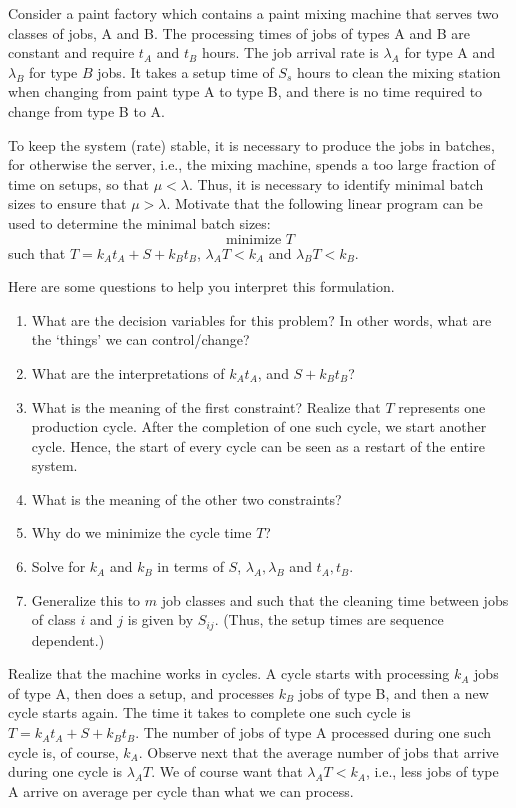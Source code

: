 \begin{exercise}
  Consider a paint factory which contains a paint mixing machine that
  serves two classes of jobs, A and B. The processing times of jobs of
  types A and B are constant and require $t_A$ and $t_B$ hours. The
  job arrival rate is $\lambda_A$ for type A and $\lambda_B$ for type
  $B$ jobs. It takes a setup time of $S_s$ hours to clean the mixing
  station when changing from paint type A to type B, and there is no
  time required to change from type B to A.

  To keep the system (rate) stable, it is necessary to produce the
  jobs in batches, for otherwise the server, i.e., the mixing machine,
  spends a too large fraction of time on setups, so that
  $\mu < \lambda$. Thus, it is necessary to identify minimal batch
  sizes to ensure that $\mu > \lambda$.  Motivate that the following linear
  program  can be used to determine the minimal batch sizes:
\begin{equation*}
  \text{minimize }  T
\end{equation*}
such that $ T=  k_A t_A + S + k_B t_B$, $\lambda_A T < k_A$ and $\lambda_B T < k_B$.
\begin{hint}
Here are some questions to help you interpret this formulation.
\begin{enumerate}
\item   What are the decision variables for this problem? In other words, what are the `things' we can control/change?
\item What are the interpretations of $k_A t_A$, and $S+k_B t_B$?
\item What is the meaning of the first constraint?  Realize that $T$
  represents one production cycle. After the completion of one such
  cycle, we start another cycle. Hence, the start of every cycle can
  be seen as a restart of the entire system.
\item   What is the meaning of the other two constraints?
\item Why do we minimize the cycle time $T$?
\item Solve for $k_A$ and $k_B$ in terms of $S$,  $\lambda_A, \lambda_B$ and $t_A, t_B$. 
\item Generalize this to $m$ job classes and such that the cleaning
  time between jobs of class $i$ and $j$ is given by $S_{ij}$. (Thus,
  the setup times are sequence dependent.) 
\end{enumerate}
\end{hint}

  \begin{solution}
    Realize that the machine works in cycles. A cycle starts with
    processing $k_A$ jobs of type A, then does a setup, and processes
    $k_B$ jobs of type B, and then a new cycle starts again.  The time
    it takes to complete one such cycle is $T=k_A t_A + S + k_B t_B$.
    The number of jobs of type A processed during one such cycle is,
    of course, $k_A$. Observe next that the average number of jobs
    that arrive during one cycle is $\lambda_A T$. We of course want
    that $\lambda_A T< k_A$, i.e., less jobs of type A arrive on
    average per cycle than what we can process.
  \end{solution}
\end{exercise}
